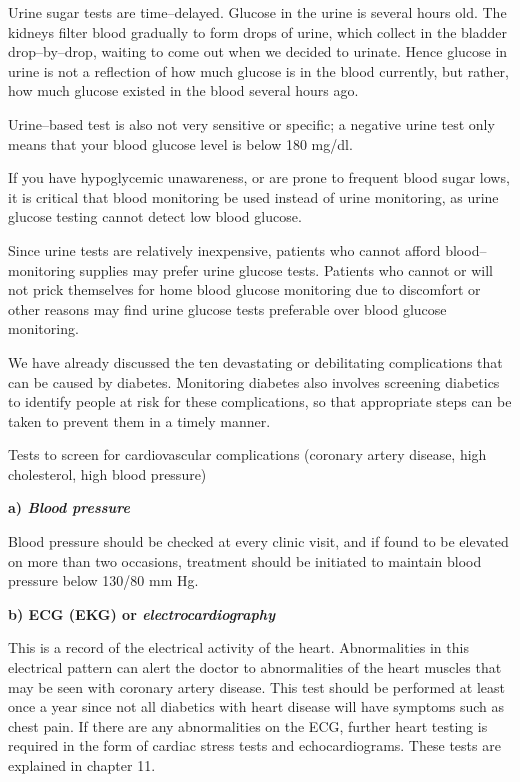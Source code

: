 \item Urine sugar tests are time–delayed. Glucose in the urine is several hours old. The kidneys filter blood gradually to form drops of urine, which collect in the bladder drop–by–drop, waiting to come out when we decided to urinate. Hence glucose in urine is not a reflection of how much glucose is in the blood currently, but rather, how much glucose existed in the blood several hours ago.

 \item Urine–based test is also not very sensitive or specific; a negative urine test only means that your blood glucose level is below 180 mg/dl.

 \item If you have hypoglycemic unawareness, or are prone to frequent blood sugar lows, it is critical that blood monitoring be used instead of urine monitoring, as urine glucose testing cannot detect low blood glucose.

Since urine tests are relatively inexpensive, patients who cannot afford blood–monitoring supplies may prefer urine glucose tests. Patients who cannot or will not prick themselves for home blood glucose monitoring due to discomfort or other reasons may find urine glucose tests preferable over blood glucose monitoring.


We have already discussed the ten devastating or debilitating complications that can be caused by diabetes. Monitoring diabetes also involves screening diabetics to identify people at risk for these complications, so that appropriate steps can be taken to prevent them in a timely manner.

Tests to screen for cardiovascular complications (coronary artery disease, high cholesterol, high blood pressure)

\textbf{a) \textit{Blood pressure}}

Blood pressure should be checked at every clinic visit, and if found to be elevated on more than two occasions, treatment should be initiated to maintain blood pressure below 130/80 mm Hg.

\textbf{b) ECG (EKG) or \textit{electrocardiography}}

This is a record of the electrical activity of the heart. Abnormalities in this electrical pattern can alert the doctor to abnormalities of the heart muscles that may be seen with coronary artery disease. This test should be performed at least once a year since not all diabetics with heart disease will have symptoms such as chest pain. If there are any abnormalities on the ECG, further heart testing is required in the form of cardiac stress tests and echocardiograms. These tests are explained in chapter 11.

